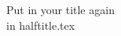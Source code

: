 \clearpage
{}
\pagestyle{empty}
\begin{center}
\vspace*{2cm}
{\huge %
Put in your title again\\[0.5cm]
in halftitle.tex
}
\end{center}
\cleardoublepage
